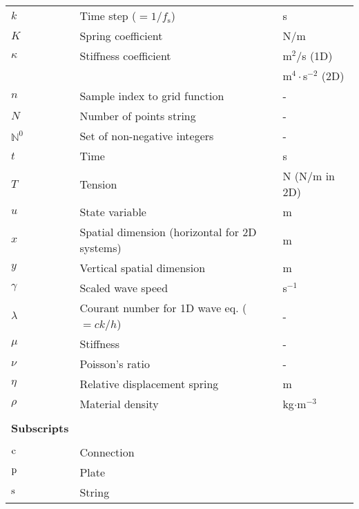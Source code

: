 {\begin{longtable}{ p{2cm} p{6.5cm} p{2.5cm}  }
 $k$ & Time step ($=1/f_\text{s}$) & s\\
 $K$ & Spring coefficient & N/m\\
 $\kappa$ & Stiffness coefficient & m$^2$/s (1D)\\
 & & m$^4\cdot$s$^{-2}$ (2D)\\
 $n$ & Sample index to grid function & - \\
 $N$ & Number of points string & -\\
 $\mathbb{N}^0$ & Set of non-negative integers %
 & -\\
 $t$ & Time & s\\
 $T$ & Tension & N (N/m in 2D)\\
 $u$ & State variable & m\\ 
 $x$ & Spatial dimension (horizontal for 2D systems) & m\\
 $y$ & Vertical spatial dimension & m\\
 $\gamma$ & Scaled wave speed & s$^{-1}$\\
 $\lambda$ & Courant number for 1D wave eq. ($=ck/h$) & -\\
 $\mu$ & Stiffness  & -\\
 $\nu$ & Poisson's ratio & -\\
 $\eta$ & Relative displacement spring & m\\
 $\rho$ & Material density & kg$\cdot$m$^{-3}$\\
 \\\hline
 {\bf Subscripts}\\\hline
 \\
 $\text{c}$ & Connection &\\
 $\text{p}$ & Plate & \\
 $\text{s}$ & String & 
\end{longtable}}